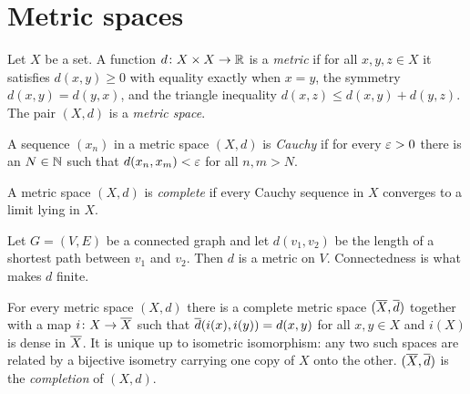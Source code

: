 %

\section{Metric spaces}

\begin{definition}\label{def:metric}
Let $X$ be a set. A function $d \colon X \times X \to \mathbb{R}$ is a \emph{metric}
if for all $x, y, z \in X$ it satisfies $d(x,y) \ge 0$ with equality exactly
when $x = y$, the symmetry $d(x,y) = d(y,x)$, and the triangle inequality
$d(x,z) \le d(x,y) + d(y,z)$. The pair $(X,d)$ is a \emph{metric space}.
\end{definition}

\begin{definition}\label{def:cauchy}
A sequence $(x_n)$ in a metric space $(X,d)$ is \emph{Cauchy} if for every
$\varepsilon > 0$ there is an $N \in \mathbb{N}$ such that $d(x_n, x_m) < \varepsilon$ for all
$n, m > N$.
\end{definition}

\begin{definition}[Completeness]\label{def:complete}
A metric space $(X,d)$ is \emph{complete} if every Cauchy sequence in $X$
converges to a limit lying in $X$.
\end{definition}

\begin{example}\label{ex:graph}
Let $G = (V,E)$ be a connected graph and let $d(v_1, v_2)$ be the length of a
shortest path between $v_1$ and $v_2$. Then $d$ is a metric on $V$.
Connectedness is what makes $d$ finite.
\end{example}

\begin{proposition}[Completion]\label{prop:completion}
For every metric space $(X,d)$ there is a complete metric space
$(\overline{X}, \overline{d})$ together with a map $i \colon X \to \overline{X}$ such that
$\overline{d}(i(x), i(y)) = d(x,y)$ for all $x, y \in X$ and $i(X)$ is dense in
$\overline{X}$. It is unique up to isometric isomorphism: any two such spaces are
related by a bijective isometry carrying one copy of $X$ onto the other.
$(\overline{X}, \overline{d})$ is the \emph{completion} of $(X,d)$.
\end{proposition}

